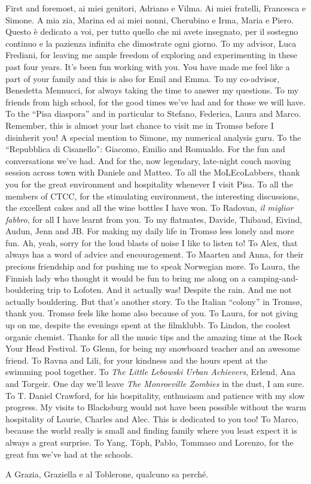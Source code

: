 First and foremost, \textitalian{ai miei genitori,
Adriano e Vilma. Ai miei fratelli, Francesca e Simone. A mia zia, Marina
ed ai miei nonni, Cherubino e Irma, Maria e Piero. Questo è dedicato a
voi, per tutto quello che mi avete insegnato, per il sostegno continuo e
la pazienza infinita che dimostrate ogni giorno.}
To my advisor, Luca Frediani, for leaving me ample freedom of exploring
and experimenting in these past four years.
It's been fun working with you. You have made me feel like a part of
your family and this is also for Emil and Emma.
To my co-advisor, Benedetta Mennucci, for always taking the time to
answer my questions.
To my friends from high school, for the good times we've had and for
those we will have.
To the \enquote{Pisa diaspora} and in particular to Stefano, Federica,
Laura and Marco. Remember, this is almost your last chance to visit me in Tromsø
before I disinherit you!
A special mention to Simone, my numerical analysis guru.
To the \enquote{Repubblica di Cisanello}: Giacomo, Emilio and Romualdo.
For the fun and conversations we've had. And for the, now legendary,
late-night couch moving session across town with Daniele and Matteo.
To all the MoLEcoLabbers, thank you for the great environment and
hospitality whenever I visit Pisa.
To all the members of CTCC, for the stimulating environment, the
interesting discussions, the excellent cakes and all the wine bottles I
have won.
To Radovan, \emph{il miglior fabbro}, for all I have learnt
from you.
To my flatmates, Davide, Thibaud, Eivind, Audun, Jenn and JB. For making
my daily life in Tromsø less lonely and more fun.
Ah, yeah, sorry for the loud blasts of noise I like to listen to!
To Alex, that always has a word of advice and encouragement.
To Maarten and Anna, for their precious friendship and for pushing me to
speak Norwegian more.
To Laura, the Finnish lady who thought it would be fun to bring me along
on a camping-and-bouldering trip to Lofoten. And it actually was!
Despite the rain. And me not actually bouldering. But that's another
story.
To the Italian \enquote{colony} in Tromsø, thank you. Tromsø feels like
home also because of you.
To Laura, for not giving up on me, despite the evenings spent at the
filmklubb.
To Lindon, the coolest organic chemist. Thanks for all the music tips
and the amazing time at the Rock Your Head Festival.
To Glenn, for being my snowboard teacher and an awesome friend.
To Ravna and Lili, for your kindness and the hours spent at the swimming
pool together.
To \emph{The Little Lebowski Urban Achievers}, Erlend, Ana and Torgeir.
One day we'll leave \emph{The Monroeville Zombies} in the dust, I am
sure.
To T. Daniel Crawford, for his hospitality, enthusiasm and patience with
my slow progress.
My visits to Blacksburg would not have been possible without the warm
hospitality of Laurie, Charles and Alec. This is dedicated to you too!
To Marco, because the world really is small and finding family where you
least expect it is always a great surprise.
To Yang, Töph, Pablo, Tommaso and Lorenzo, for the great fun we've had at the
schools.

\textitalian{A Grazia, Graziella e al Toblerone, qualcuno sa perché.}
